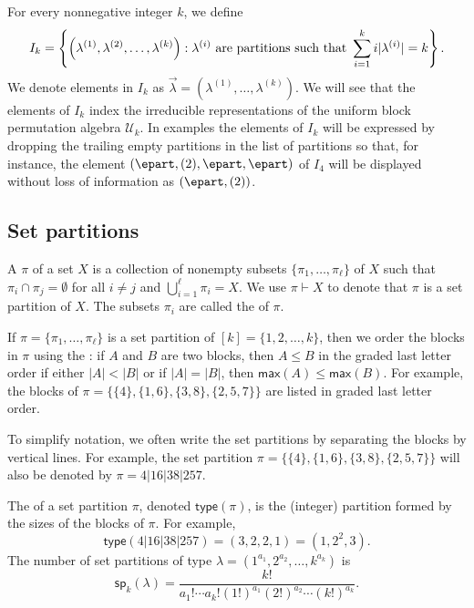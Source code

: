 For every nonnegative integer $k$, we define
\begin{equation}
\label{equation.Ik}
    I_k = \left\{ \left(\lambda^{(1)}, \lambda^{(2)}, \ldots, \lambda^{(k)}\right) : \lambda^{(i)}
    \hbox{ are partitions such that }
    \sum_{i=1}^k i |\lambda^{(i)}| = k \right\}.
\end{equation}
We denote elements in $I_k$ as $\vec{\lambda} = (\lambda^{(1)},\ldots,\lambda^{(k)})$.
We will see that the elements of $I_k$ index the irreducible representations of
the uniform block permutation algebra $\mathcal{U}_k$.  In examples the elements of
$I_k$ will be expressed by dropping the trailing empty partitions in the list of partitions
so that, for instance, the element $(\epart, (2), \epart, \epart)$ of $I_4$ will be displayed
without loss of information as $(\epart, (2))$.

\subsection{Set partitions}
\label{section.set partitions}
A  $\pi$ of a set $X$ is a collection of nonempty subsets $\{\pi_1, \ldots, \pi_\ell\}$ of $X$ such that
$\pi_i \cap \pi_j = \emptyset$ for all $i \neq j$ and $\bigcup_{i=1}^{\ell} \pi_i = X$.  We use $\pi \vdash X$ to denote that $\pi$
is a set partition of $X$. The subsets $\pi_i$ are called the  of $\pi$.

If $\pi = \{\pi_1, \ldots, \pi_\ell\}$ is a set partition of $[k] = \{1, 2, \ldots, k\}$,
then we order the blocks in $\pi$ using the : if $A$ and $B$ are two blocks, then
$A\leqslant B$ in the graded last letter order if either $|A|<|B|$ or if $|A|=|B|$, then $\mathsf{max}(A)\leqslant \mathsf{max}(B)$.
For example, the blocks of $\pi = \{\{4\}, \{1,6\},\{3,8\},\{2,5,7\}\}$ are listed in graded last letter order.

To simplify notation, we often write the set partitions by separating the blocks by vertical lines. For example, the set partition
$\pi = \{\{4\}, \{1,6\},\{3,8\},\{2,5,7\}\}$ will also be denoted by $\pi = 4|16|38|257$.

The  of a set partition $\pi$, denoted $\mathsf{type}(\pi)$,
is the (integer) partition formed by the sizes of the blocks of $\pi$.
For example,
\begin{equation*}
    \mathsf{type}(4|16|38|257) = (3,2,2,1) = (1, 2^2, 3).
\end{equation*}
The number of set partitions of type $\lambda = (1^{a_1}, 2^{a_2}, \ldots, k^{a_k})$ is
\begin{equation}\label{eq:nosetpartitions}
    \mathsf{sp}_k(\lambda) = \frac{k!}{a_1! \cdots a_k!(1!)^{a_1}(2!)^{a_2} \cdots (k!)^{a_k}}.
\end{equation}

